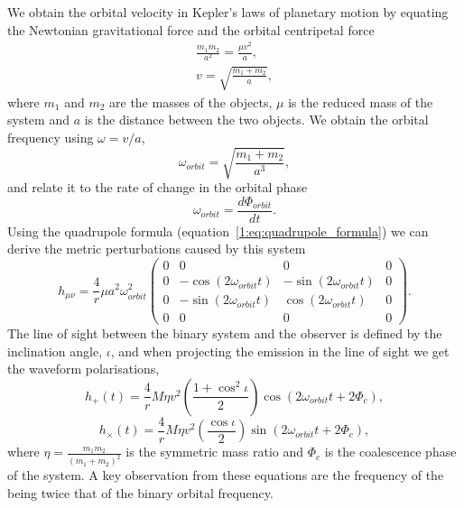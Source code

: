 We obtain the orbital velocity in Kepler's laws of planetary motion by equating the Newtonian gravitational force and the orbital centripetal force
%
\begin{align}
    \frac{m_{1} m_{2}}{a^{2}} = \frac{\mu v^{2}}{a}, \\
    v = \sqrt{\frac{m_{1} + m_{2}}{a}},
\end{align}
%
where $m_{1}$ and $m_{2}$ are the masses of the objects, $\mu$ is the reduced mass of the system and $a$ is the distance between the two objects.
%
We obtain the orbital frequency using $\omega = v/a$,
%
\begin{equation}
    \omega_{orbit} = \sqrt{\frac{m_{1} + m_{2}}{a^{3}}},
    \label{1:eq:omega_orbit}
\end{equation}
%
and relate it to the rate of change in the orbital phase
%
\begin{equation}
    \omega_{orbit} = \frac{d \Phi_{orbit}}{dt}.
\end{equation}
%
Using the quadrupole formula (equation~\ref{1:eq:quadrupole_formula}) we can derive the metric perturbations caused by this system
%
\begin{equation}
    h_{\mu\nu} = \frac{4}{r} \mu a^{2} \omega^{2}_{orbit}
    \begin{pmatrix}
      0 & 0 & 0 & 0 \\
      0 & -\cos\left(2\omega_{orbit}t\right) & -\sin\left(2\omega_{orbit}t\right) & 0 \\
      0 & -\sin\left(2\omega_{orbit}t\right) & \cos\left(2\omega_{orbit}t\right) & 0 \\
      0 & 0 & 0 & 0
   \end{pmatrix}.
\end{equation}
%
The line of sight between the binary system and the observer is defined by the inclination angle, $\iota$, and when projecting the \gwadj emission in the line of sight we get the waveform polarisations,
%
\begin{equation}
    h_{+}(t) = \frac{4}{r} M\eta v^{2} \left(\frac{1 + \cos^{2}\iota}{2}\right)\cos\left(2\omega_{orbit}t+2\Phi_{c}\right),
\end{equation}
%
\begin{equation}
    h_{\times}(t) = \frac{4}{r} M\eta v^{2} \left(\frac{\cos\iota}{2}\right)\sin\left(2\omega_{orbit}t+2\Phi_{c}\right),
\end{equation}
%
where $\eta = \frac{m_{1}m_{2}}{(m_{1} + m_{2})^{2}}$ is the symmetric mass ratio and $\Phi_{c}$ is the coalescence phase of the system. A key observation from these equations are the frequency of the \gws being twice that of the binary orbital frequency.

